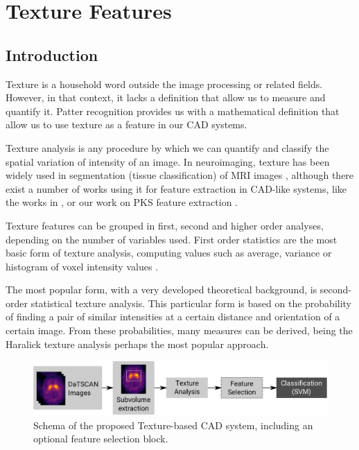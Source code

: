 \chapter{Texture Features}\label{ch:texture}
\section{Introduction}
Texture is a household word outside the image processing or related fields. However, in that context, it lacks a definition that allow us to measure and quantify it. Patter recognition provides us with a mathematical definition that allow us to use texture as a feature in our \ac{CAD} systems. 

Texture analysis is any procedure by which we can quantify and classify the spatial variation of intensity of an image. In neuroimaging, texture has been widely used in segmentation (tissue classification) of \ac{MRI} images \cite{Saeed2002,Alejo2003,Wang2009}, although there exist a number of works using it for feature extraction in \ac{CAD}-like systems, like the works in \cite{kovalev2001three,sikio2015mr}, or our work on \ac{PKS} feature extraction \cite{Martinez-Murcia2013266,martinez2014parametrization}. 

Texture features can be grouped in first, second and higher order analyses, depending on the number of variables used. First order statistics \cite{Martinez-Murcia2016b} are the most basic form of texture analysis, computing values such as average, variance or histogram of voxel intensity values \cite{Srinivasan2008}. 

The most popular form, with a very developed theoretical background, is second-order statistical texture analysis. This particular form is based on the probability of finding a pair of similar intensities at a certain distance and orientation of a certain image. From these probabilities, many measures can be derived, being the Haralick texture analysis \cite{Haralick73} perhaps the most popular approach. 

\begin{figure}[htp]
\centering
\includegraphics[width=0.9\linewidth]{Graphics/ch5/01-flowdiagram}
\caption[Schema of the proposed Texture-based \acs{CAD} system.]{Schema of the proposed Texture-based \ac{CAD} system, including an optional feature selection block.}
\label{fig:textureCAD}
\end{figure}

